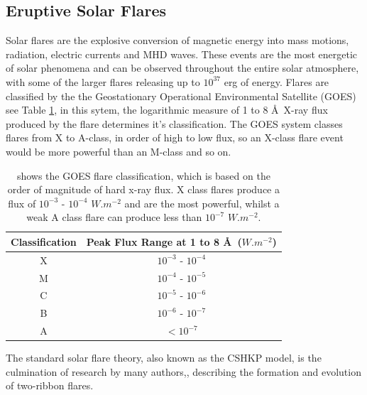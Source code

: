 


\subsection{Eruptive Solar Flares}\label{flares}

Solar flares are the explosive conversion of magnetic energy into mass motions, radiation, electric currents and MHD waves. These events are the most energetic of solar phenomena and can be observed throughout the entire solar atmosphere, with some of the larger flares releasing up to $10^{37}$ erg of energy. Flares are classified by the the Geostationary Operational Environmental Satellite (GOES) see Table \ref{goes}, in this sytem, the logarithmic measure of 1 to 8 \AA\ X-ray flux produced by the flare determines it's classification. The GOES system classes flares from X to A-class, in order of high to low flux, so an X-class flare event would be more powerful than an M-class and so on. \\

\begin{table}[h]
\centering
\begin{tabular}{|c|c|}\label{GOES}
Classification & Peak Flux Range at 1 to 8 \AA\ ($W.m^{-2}$) \\
\hline
X & $10^{-3}$ - $10^{-4}$\\
M & $10^{-4}$ - $10^{-5}$\\
C & $10^{-5}$ - $10^{-6}$\\
B & $10^{-6}$ - $10^{-7}$\\
A & $<10^{-7}$\\
\end{tabular}
\caption{shows the GOES flare classification, which is based on the order of magnitude of hard x-ray flux. X class flares produce a flux of $10^{-3}$ - $10^{-4}$ $W.m^{-2}$ and are the most powerful, whilst a weak A class flare can produce less than $10^{-7}$ $W.m^{-2}$.}\label{goes}
\end{table}

The standard solar flare theory, also known as the CSHKP model, is the culmination of research by many authors,\citep{1964NASSP..50..451C, 1966Natur.211..695S, 1974SoPh...34..323H, 1976SoPh...50...85K}, describing the formation and evolution of two-ribbon flares. 

